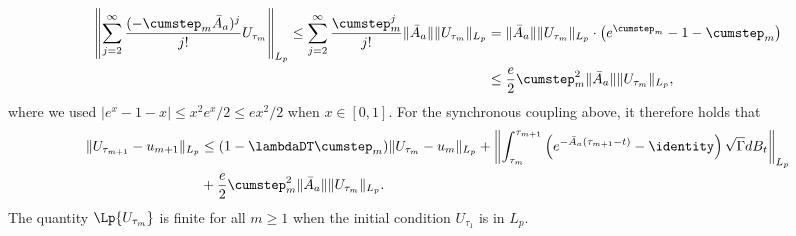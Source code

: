 \documentclass[11pt]{article}
\begin{document}
\begin{align*}
    \left\lVert 
    \sum_{j=2}^\infty \frac{(-\cumstep_m \bar{A}_a)^j}{j!} U_{\tau_m}
    \right\rVert_{L_p}
    \leq 
    \sum_{j=2}^\infty \frac{\cumstep_m^j}{j!} \lVert \bar{A}_a \rVert \lVert U_{\tau_m} \rVert_{L_p}
    &=
    \lVert \bar{A}_a \rVert \lVert U_{\tau_m} \rVert_{L_p} \cdot \left( e^{\cumstep_m} - 1 - \cumstep_m
    \right)
    \\ &
    \leq 
    \frac{e}{2} \cumstep_m^2\lVert \bar{A}_a \rVert \lVert U_{\tau_m} \rVert_{L_p} ,
\end{align*}
where we used $\lvert e^x - 1 - x \rvert \leq x^2 e^x / 2 \leq e x^2/2$ when $x \in [0, 1]$. 
For the synchronous coupling above, it therefore holds that
\begin{equation}\label{eq:OU_recursion1}
\begin{split}
    \lVert U_{\tau_{m+1}} - u_{m+1} \rVert_{L_p}
    &\leq
    (1 - \lambdaDT \cumstep_m) \lVert U_{\tau_m} - u_m \rVert_{L_p}
    + 
    \left\lVert     \int_{\tau_m}^{\tau_{m+1}} \left(e^{-\bar{A}_a (\tau_{m+1} - t)} - \identity \right)  \sqrt{\Gamma} dB_t\right\rVert_{L_p}
    \\ &
    + \frac{e}{2} \cumstep_m^2\lVert \bar{A}_a \rVert \lVert U_{\tau_m} \rVert_{L_p} . 
\end{split}
\end{equation}
The quantity $\Lp{U_{\tau_m}}$ is finite for all $m \geq 1$ when the initial condition $U_{\tau_1}$ is in $L_p$. 
\end{document}
